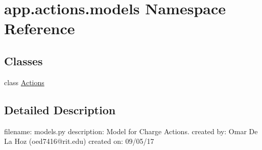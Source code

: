 \hypertarget{namespaceapp_1_1actions_1_1models}{}\section{app.\+actions.\+models Namespace Reference}
\label{namespaceapp_1_1actions_1_1models}
\subsection*{Classes}
\begin{DoxyCompactItemize}
\item 
class \mbox{\hyperlink{classapp_1_1actions_1_1models_1_1_actions}{Actions}}
\end{DoxyCompactItemize}


\subsection{Detailed Description}
\begin{DoxyVerb}filename: models.py
description: Model for Charge Actions.
created by: Omar De La Hoz (oed7416@rit.edu)
created on: 09/05/17
\end{DoxyVerb}
 